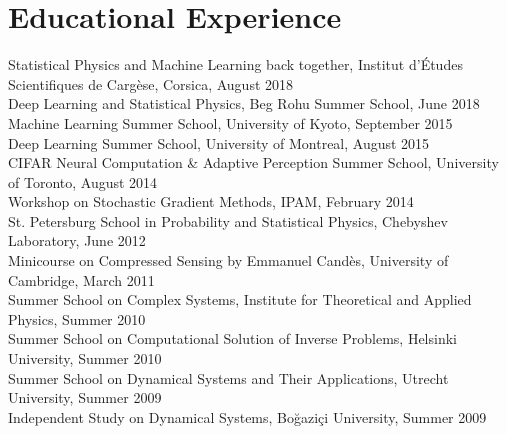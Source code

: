 \documentclass[10pt,letterpaper]{article}
\renewenvironment{itemize}
{
\begin{list}{}{\setlength{\leftmargin}{1.5em}}
}
{
  \end{list}
}
\begin{document}
\section*{Educational Experience}
\begin{itemize}
\item Statistical Physics and Machine Learning back together, Institut d'\'Etudes Scientifiques de Carg\`ese, Corsica, August 2018 \\
Deep Learning and Statistical Physics, Beg Rohu Summer School, June 2018 \\
Machine Learning Summer School, University of Kyoto, September 2015 \\ 
Deep Learning Summer School, University of Montreal, August 2015 \\ 
CIFAR Neural Computation \& Adaptive Perception Summer School, University of Toronto, August 2014 \\ 
Workshop on Stochastic Gradient Methods, IPAM, February 2014 \\ 
St. Petersburg School in Probability and Statistical Physics, Chebyshev Laboratory, June 2012 \\ 
Minicourse on Compressed Sensing by Emmanuel Cand\`{e}s, University of Cambridge, March 2011 \\ 
Summer School on Complex Systems, Institute for Theoretical and Applied Physics, Summer 2010 \\ 
Summer School on Computational Solution of Inverse Problems, Helsinki University, Summer 2010 \\ 
Summer School on Dynamical Systems and Their Applications, Utrecht University, Summer 2009 \\ 
Independent Study on Dynamical Systems, Bo\u{g}azi\c{c}i University, Summer 2009 
\end{itemize}

\end{document}
